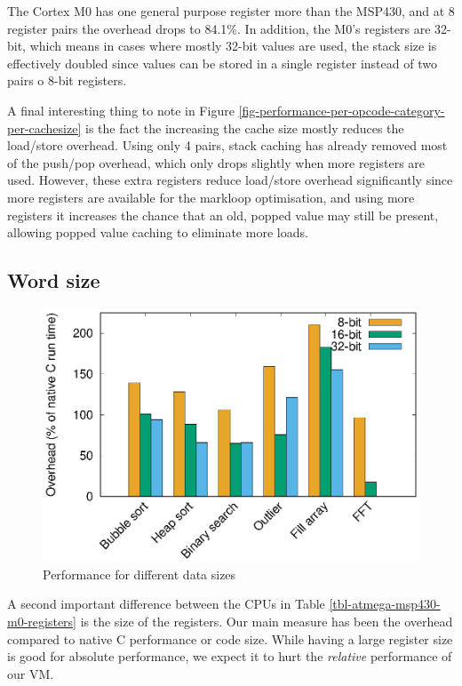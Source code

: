 The Cortex M0 has one general purpose register more than the MSP430, and at 8 register pairs the overhead drops to 84.1\%. In addition, the M0's registers are 32-bit, which means in cases where mostly 32-bit values are used, the stack size is effectively doubled since values can be stored in a single register instead of two pairs o 8-bit registers.

A final interesting thing to note in Figure \ref{fig-performance-per-opcode-category-per-cachesize} is the fact the increasing the cache size mostly reduces the load/store overhead. Using only 4 pairs, stack caching has already removed most of the push/pop overhead, which only drops slightly when more registers are used. However, these extra registers reduce load/store overhead significantly since more registers are available for the markloop optimisation, and using more registers it increases the chance that an old, popped value may still be present, allowing popped value caching to eliminate more loads.

\subsection{Word size}
\begin{figure}
    \centering
    \includegraphics[width=\myfiguresizeperformance]{8_16_32_bit.eps}
    \caption{Performance for different data sizes}
    \label{fig-performance-8-16-32-bit}
\end{figure}



A second important difference between the CPUs in Table \ref{tbl-atmega-msp430-m0-registers} is the size of the registers. Our main measure has been the overhead compared to native C performance or code size. While having a large register size is good for absolute performance, we expect it to hurt the \emph{relative} performance of our VM.

